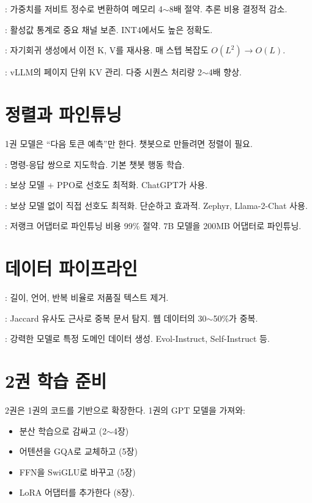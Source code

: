 : 가중치를 저비트 정수로 변환하여 메모리 4$\sim$8배 절약. 추론 비용 결정적 감소.

: 활성값 통계로 중요 채널 보존. INT4에서도 높은 정확도.

: 자기회귀 생성에서 이전 K, V를 재사용. 매 스텝 복잡도 $O(L^2) \to O(L)$.

: vLLM의 페이지 단위 KV 관리. 다중 시퀀스 처리량 2$\sim$4배 향상.

\section{정렬과 파인튜닝}

1권 모델은 ``다음 토큰 예측''만 한다. 챗봇으로 만들려면 정렬이 필요.

: 명령-응답 쌍으로 지도학습. 기본 챗봇 행동 학습.

: 보상 모델 + PPO로 선호도 최적화. ChatGPT가 사용.

: 보상 모델 없이 직접 선호도 최적화. 단순하고 효과적. Zephyr, Llama-2-Chat 사용.

: 저랭크 어댑터로 파인튜닝 비용 99\% 절약. 7B 모델을 200MB 어댑터로 파인튜닝.

\section{데이터 파이프라인}

: 길이, 언어, 반복 비율로 저품질 텍스트 제거.

: Jaccard 유사도 근사로 중복 문서 탐지. 웹 데이터의 30$\sim$50\%가 중복.

: 강력한 모델로 특정 도메인 데이터 생성. Evol-Instruct, Self-Instruct 등.

\section{2권 학습 준비}

2권은 1권의 코드를 기반으로 확장한다. 1권의 GPT 모델을 가져와:
\begin{itemize}
  \item 분산 학습으로 감싸고 (2$\sim$4장)
  \item 어텐션을 GQA로 교체하고 (5장)
  \item FFN을 SwiGLU로 바꾸고 (5장)
  \item LoRA 어댑터를 추가한다 (8장).
\end{itemize}

